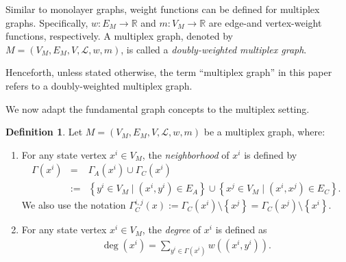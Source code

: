 \documentclass[preprint,12pt,number]{elsarticle}
\theoremstyle{plain} %
\theoremstyle{definition} %
\newtheorem{definition}[theorem]{\indent\sc Definition}
\begin{document}
Similar to monolayer graphs, weight functions can be defined for multiplex graphs. Specifically, $w : E_M \to \mathbb{R}$ and $m : V_M \to \mathbb{R}$ are edge-and vertex-weight functions, respectively. A multiplex graph, denoted by $M=(V_M,E_M,V,\mathcal{L},w,m)$, is called a \textit{doubly-weighted multiplex graph}.

Henceforth, unless stated otherwise, the term “multiplex graph” in this paper refers to a doubly-weighted multiplex graph.

We now adapt the fundamental graph concepts to the multiplex setting.
\begin{definition}
    Let $M = (V_M, E_M, V, \mathcal{L}, w, m)$ be a multiplex graph, where: 
    \begin{enumerate}
    \item For any state vertex $x^i \in V_M$, the \textit{neighborhood} of $x^i$ is defined by
    \begin{eqnarray*}
    \Gamma (x^i) &=& \Gamma_A(x^i) \cup \Gamma_C (x^i)\\
    &:=&\left\{ y^i \in V_M \mid (x^i, y^i) \in E_A \right\} \cup \left\{ x^j \in V_M \mid (x^i, x^j) \in E_C \right\}.
    \end{eqnarray*}
    We also use the notation $\Gamma^{i,j}_C (x) := \Gamma_C(x^i) \setminus \left\{x^j \right\} = \Gamma_C (x^j) \setminus \left\{x^i \right\}$.
    \item For any state vertex $x^i \in V_M$, the \textit{degree} of $x^i$ is defined as
    \begin{eqnarray*}
    \deg (x^i) = \sum_{y^i \in \Gamma (x^i)}w((x^i,y^i)).
    \end{eqnarray*}
    \end{enumerate}
\end{definition}
\end{document}
